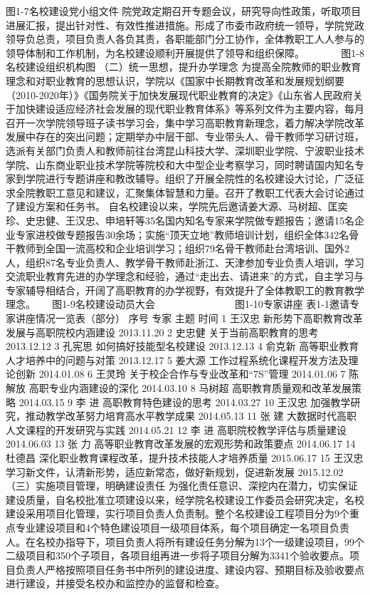 图1-7名校建设党小组文件
院党政定期召开专题会议，研究导向性政策，听取项目进展汇报，提出针对性、有效性推进措施。形成了市委市政府统一领导，学院党政领导负总责，项目负责人各负其责，各职能部门分工协作，全体教职工人人参与的领导体制和工作机制，为名校建设顺利开展提供了领导和组织保障。
  　　　
图1-8名校建设组织机构图
（二）统一思想，提升办学理念
为提高全院教师的职业教育理念和对职业教育的思想认识，学院以《国家中长期教育改革和发展规划纲要（2010-2020年）》《国务院关于加快发展现代职业教育的决定》《山东省人民政府关于加快建设适应经济社会发展的现代职业教育体系》等系列文件为主要内容，每月召开一次学院领导班子读书学习会，集中学习高职教育新理念，着力解决学院改革发展中存在的突出问题；定期举办中层干部、专业带头人、骨干教师学习研讨班，选派有关部门负责人和教师前往台湾昆山科技大学、深圳职业学院、宁波职业技术学院、山东商业职业技术学院等院校和大中型企业考察学习，同时聘请国内知名专家到学院进行专题讲座和教改辅导。组织了开展全院性的名校建设大讨论，广泛征求全院教职工意见和建议，汇聚集体智慧和力量。召开了教职工代表大会讨论通过了建设方案和任务书。
自名校建设以来，学院先后邀请姜大源、马树超、匡奕珍、史忠健、王汉忠、申培轩等35名国内知名专家来学院做专题报告；邀请15名企业专家进校做专题报告30余场；实施“顶天立地”教师培训计划，组织全体342名骨干教师到全国一流高校和企业培训学习；组织79名骨干教师赴台湾培训、国外2人，组织87名专业负责人、教学骨干教师赴浙江、天津参加专业负责人培训，学习交流职业教育先进的办学理念和经验，通过“走出去、请进来”的方式，自主学习与专家辅导相结合，开阔了高职教育的办学视野，有效提升了全体教职工的教育教学理念。
　
图1-9名校建设动员大会　　　　　　　　图1-10专家讲座
表1-1邀请专家讲座情况一览表（部分）
序号
专家
主题
时间
1
王汉忠
新形势下高职教育改革发展与高职院校内涵建设
2013.11.20
2
史忠健
关于当前高职教育的思考
2013.12.12
3
孔宪思
如何搞好技能型名校建设
2013.12.13
4
俞克新
高等职业教育人才培养中的问题与对策
2013.12.17
5
姜大源
工作过程系统化课程开发方法及理论创新
2014.01.08
6
王灵玲
关于校企合作与专业改革和“7S”管理
2014.01.06
7
陈解放
高职专业内涵建设的深化
2014.03.10
8
马树超
高职教育质量观和改革发展策略
2014.03.15
9
李  进
高职教育特色建设的思考
2014.03.27
10
王汉忠
加强教学研究，推动教学改革努力培育高水平教学成果
2014.05.13
11
张  建
大数据时代高职人文课程的开发研究与实践
2014.05.21
12
李  进
高职院校教学评估与质量建设
2014.06.03
13
张  力
高等职业教育改革发展的宏观形势和政策要点
2014.06.17
14
杜德昌
深化职业教育课程改革，提升技术技能人才培养质量
2015.06.17
15
王汉忠
学习新文件，认清新形势，适应新常态，做好新规划，促进新发展
2015.12.02
（三）实施项目管理，明确建设责任
为强化责任意识、深挖内在潜力，切实保证建设质量，自名校批准立项建设以来，经学院名校建设工作委员会研究决定，名校建设采用项目化管理，实行项目负责人负责制。整个名校建设工程项目分为9个重点专业建设项目和4个特色建设项目一级项目体系，每个项目确定一名项目负责人。在名校办指导下，项目负责人将所有建设任务分解为13个一级建设项目，99个二级项目和350个子项目，各项目组再进一步将子项目分解为3341个验收要点。项目负责人严格按照项目任务书中所列的建设进度、建设内容、预期目标及验收要点进行建设，并接受名校办和监控办的监督和检查。
